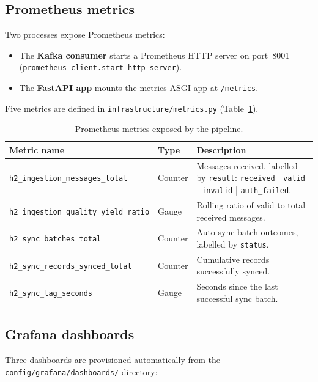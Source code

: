 \subsection{Prometheus metrics}
\label{subsec:prometheus}

Two processes expose Prometheus metrics:
\begin{itemize}
  \item The \textbf{Kafka consumer} starts a Prometheus HTTP server on
        port~8001 (\texttt{prometheus\_client.start\_http\_server}).
  \item The \textbf{FastAPI app} mounts the metrics ASGI app at
        \texttt{/metrics}.
\end{itemize}

Five metrics are defined in \texttt{infrastructure/metrics.py}
(Table~\ref{tab:metrics}).

\begin{table}[H]
  \centering
  \caption{Prometheus metrics exposed by the pipeline.}
  \label{tab:metrics}
  \begin{tabularx}{\textwidth}{llX}
    \toprule
    \textbf{Metric name} & \textbf{Type} & \textbf{Description} \\
    \midrule
    \texttt{h2\_ingestion\_messages\_total}
      & Counter
      & Messages received, labelled by \texttt{result}:
        \texttt{received} | \texttt{valid} | \texttt{invalid} |
        \texttt{auth\_failed}. \\
    \texttt{h2\_ingestion\_quality\_yield\_ratio}
      & Gauge
      & Rolling ratio of valid to total received messages. \\
    \texttt{h2\_sync\_batches\_total}
      & Counter
      & Auto-sync batch outcomes, labelled by \texttt{status}. \\
    \texttt{h2\_sync\_records\_synced\_total}
      & Counter
      & Cumulative records successfully synced. \\
    \texttt{h2\_sync\_lag\_seconds}
      & Gauge
      & Seconds since the last successful sync batch. \\
    \bottomrule
  \end{tabularx}
\end{table}

\subsection{Grafana dashboards}
\label{subsec:grafana}

Three dashboards are provisioned automatically from the
\texttt{config/grafana/dashboards/} directory:


